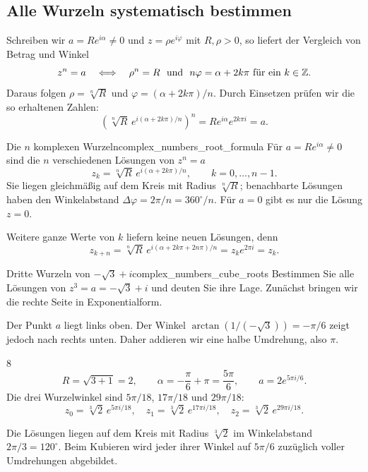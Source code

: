 \clearpage
\subsection{Alle Wurzeln systematisch bestimmen}
Schreiben wir $a=Re^{i\alpha}\ne0$ und $z=\rho e^{i\varphi}$ mit
$R,\rho>0$, so liefert der Vergleich von Betrag und Winkel
\[
  z^n=a
  \quad\Longleftrightarrow\quad
  \rho^n=R\ \text{ und }\ n\varphi=\alpha+2k\pi
  \text{ für ein }k\in\mathbb{Z}.
\]
Daraus folgen $\rho=\sqrt[n]{R}$ und $\varphi=(\alpha+2k\pi)/n$.
Durch Einsetzen prüfen wir die so erhaltenen Zahlen:
\[
  \left(\sqrt[n]{R}\,e^{i(\alpha+2k\pi)/n}\right)^n
    =Re^{i\alpha}e^{2k\pi i}=a.
\]
\begin{TheoremBox}{Die $n$ komplexen Wurzeln}{complex_numbers_root_formula}
  Für $a=Re^{i\alpha}\ne0$ sind die $n$ verschiedenen Lösungen von $z^n=a$
  \[
    z_k=\sqrt[n]{R}\,e^{i(\alpha+2k\pi)/n},\qquad k=0,\ldots,n-1.
  \]
  Sie liegen gleichmäßig auf dem Kreis mit Radius $\sqrt[n]{R}$;
  benachbarte Lösungen haben den Winkelabstand
  $\Delta\varphi=2\pi/n=360^\circ/n$.
  Für $a=0$ gibt es nur die Lösung $z=0$.
\end{TheoremBox}
Weitere ganze Werte von $k$ liefern keine neuen Lösungen, denn
\[
  z_{k+n}=\sqrt[n]{R}\,e^{i(\alpha+2k\pi+2n\pi)/n}
    =z_k e^{2\pi i}=z_k.
\]

\begin{ExampleBox}{Dritte Wurzeln von $-\sqrt3+i$}{complex_numbers_cube_roots}
  Bestimmen Sie alle Lösungen von $z^3=a=-\sqrt3+i$ und deuten Sie ihre Lage.
  Zunächst bringen wir die rechte Seite in Exponentialform.

  Der Punkt $a$ liegt links oben. Der Winkel
  $\arctan(1/(-\sqrt3))=-\pi/6$ zeigt jedoch nach rechts unten.
  Daher addieren wir eine halbe Umdrehung, also $\pi$.
  \begin{ClozeArea}{8}
    \[
      R=\sqrt{3+1}=2,\qquad
      \alpha=-\frac\pi6+\pi=\frac{5\pi}{6},\qquad
      a=2e^{5\pi i/6}.
    \]
    Die drei Wurzelwinkel sind $5\pi/18$, $17\pi/18$ und $29\pi/18$:
    \[
      z_0=\sqrt[3]2\,e^{5\pi i/18},\quad
      z_1=\sqrt[3]2\,e^{17\pi i/18},\quad
      z_2=\sqrt[3]2\,e^{29\pi i/18}.
    \]
  \end{ClozeArea}
  \begin{center}
  \end{center}
  Die Lösungen liegen auf dem Kreis mit Radius $\sqrt[3]2$ im Winkelabstand
  $2\pi/3=120^\circ$. Beim Kubieren wird jeder ihrer Winkel auf
  $5\pi/6$ zuzüglich voller Umdrehungen abgebildet.
\end{ExampleBox}
